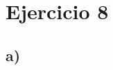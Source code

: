 \documentclass{article}
\begin{document}
    \section*{Ejercicio 8}

    \subsection*{a)}
    
\end{document}
